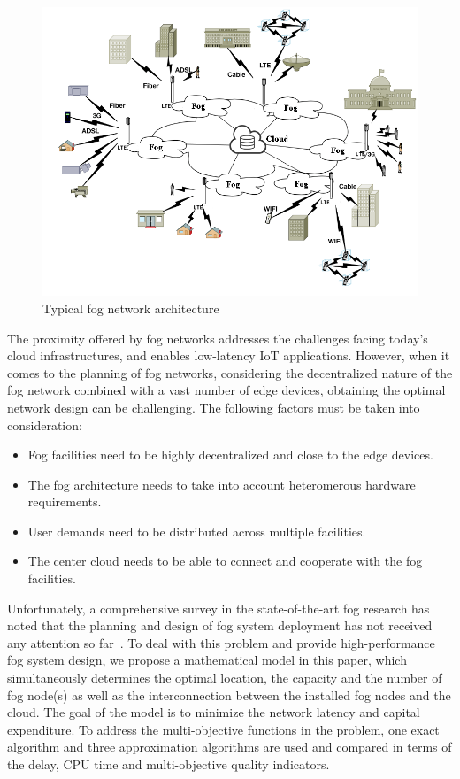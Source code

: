 \documentclass[10pt,journal,compsoc]{IEEEtran}
\begin{document}
\begin{figure}[ht]
\centerline{\includegraphics[width=\columnwidth]{fog-g.png}}
\caption{Typical fog network architecture} 
\label{foggg}
\end{figure}
 
The proximity offered by fog networks addresses the challenges facing today's cloud infrastructures, and enables low-latency IoT applications. However, when it comes to the planning of fog networks, considering the decentralized nature of the fog network combined with a vast number of edge devices, obtaining the optimal network design can be challenging. The following factors must be taken into consideration:
\begin{itemize}
\item Fog facilities need to be highly decentralized and close to the edge devices.
\item The fog architecture needs to take into account heteromerous hardware requirements.
\item User demands need to be distributed across multiple facilities.
\item The center cloud needs to be able to connect and cooperate with the fog facilities.
\end{itemize}

Unfortunately, a comprehensive survey in the state-of-the-art fog research has noted that the planning and design of fog system deployment has not received any attention so far~\cite{mouradian2017comprehensive}. To deal with this problem and provide high-performance fog system design, we propose a mathematical model in this paper, which simultaneously determines the optimal location, the capacity and the number of fog node(s) as well as the interconnection between the installed fog nodes and the cloud. The goal of the model is to minimize the network latency and capital expenditure. To address the multi-objective functions in the problem, one exact algorithm and three approximation algorithms are used and compared in terms of the delay, CPU time and multi-objective quality indicators. 
\end{document}
